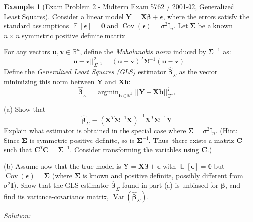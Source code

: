 \documentclass[11pt]{article}
\theoremstyle{definition}
\newtheorem{example}[theorem]{Example}
\theoremstyle{remark}
\DeclareMathOperator{\E}{\mathbb{E}}
\DeclareMathOperator{\Var}{\operatorname{Var}}
\DeclareMathOperator{\Cov}{\operatorname{Cov}}
\DeclareMathOperator{\argmin}{\operatorname{argmin}}
\begin{document}
\begin{example}[Exam Problem 2 - Midterm Exam 5762 / 2001-02, Generalized Least Squares] \label{ex:exam2_gls}
Consider a linear model $\bm{Y} = \bm{X}\bm{\beta} + \bm{\epsilon}$, where the errors satisfy the standard assumptions $\E[\bm{\epsilon}] = \mathbf{0}$ and $\Cov(\bm{\epsilon}) = \sigma^2 \bm{I}_n$. Let $\bm{\Sigma}$ be a known $n \times n$ symmetric positive definite matrix.

For any vectors $\bm{u}, \bm{v} \in \mathbb{R}^n$, define the \emph{Mahalanobis norm} induced by $\bm{\Sigma}^{-1}$ as:
\[ ||\bm{u} - \bm{v}||_{\Sigma^{-1}}^2 = (\bm{u} - \bm{v})^T \bm{\Sigma}^{-1} (\bm{u} - \bm{v}) \]
Define the \emph{Generalized Least Squares (GLS)} estimator $\hat{\bm{\beta}}_{\Sigma}$ as the vector minimizing this norm between $\bm{Y}$ and $\bm{X}\bm{b}$:
\[ \hat{\bm{\beta}}_{\Sigma} = \argmin_{\bm{b} \in \mathbb{R}^k} ||\bm{Y} - \bm{X}\bm{b}||_{\Sigma^{-1}}^2 \]

(a) Show that
\[ \hat{\bm{\beta}}_{\Sigma} = (\bm{X}^T \bm{\Sigma}^{-1} \bm{X})^{-1} \bm{X}^T \bm{\Sigma}^{-1} \bm{Y} \]
Explain what estimator is obtained in the special case where $\bm{\Sigma} = \sigma^2 \bm{I}_n$.
(Hint: Since $\bm{\Sigma}$ is symmetric positive definite, so is $\bm{\Sigma}^{-1}$. Thus, there exists a matrix $\bm{C}$ such that $\bm{C}^T \bm{C} = \bm{\Sigma}^{-1}$. Consider transforming the variables using $\bm{C}$.)

(b) Assume now that the true model is $\bm{Y} = \bm{X}\bm{\beta} + \bm{\epsilon}$ with $\E[\bm{\epsilon}] = \mathbf{0}$ but $\Cov(\bm{\epsilon}) = \bm{\Sigma}$ (where $\bm{\Sigma}$ is known and positive definite, possibly different from $\sigma^2\bm{I}$). Show that the GLS estimator $\hat{\bm{\beta}}_{\Sigma}$ found in part (a) is unbiased for $\bm{\beta}$, and find its variance-covariance matrix, $\Var(\hat{\bm{\beta}}_{\Sigma})$.

\emph{Solution:}


\end{example}
\end{document}
